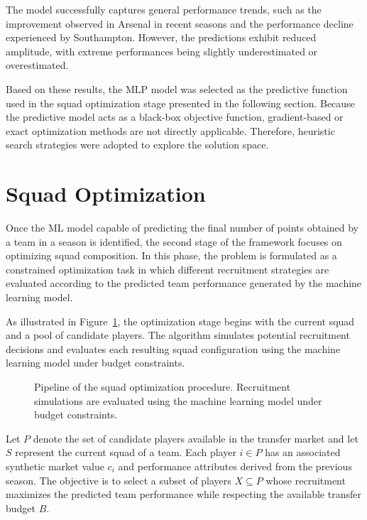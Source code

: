 \documentclass[a4paper,fleqn]{cas-sc}
\begin{document}
The model successfully captures general performance trends, such as the improvement observed in Arsenal in recent seasons and the performance decline
experienced by Southampton. However, the predictions exhibit reduced amplitude, with extreme performances being slightly underestimated or overestimated.

Based on these results, the MLP model was selected as the predictive function used in the squad optimization stage presented in the following section.
Because the predictive model acts as a black-box objective function, gradient-based or exact optimization methods are not directly applicable. 
Therefore, heuristic search strategies were adopted to explore the solution space.

\section{Squad Optimization}

Once the ML model capable of predicting the final number of points obtained by a team in a season is identified, the second stage of the framework
focuses on optimizing squad composition. In this phase, the problem is formulated as a constrained optimization task in which different recruitment strategies are
evaluated according to the predicted team performance generated by the machine learning model.

As illustrated in Figure~\ref{fig:optimization_pipeline}, the optimization stage begins with the current squad and a pool of candidate players. 
The algorithm simulates potential recruitment decisions and evaluates each resulting squad configuration using the machine learning model under 
budget constraints.

\begin{figure}[htbp]
\centering

\caption{Pipeline of the squad optimization procedure. Recruitment simulations are evaluated using the machine learning model under budget constraints.}
\label{fig:optimization_pipeline}
\end{figure}

Let $P$ denote the set of candidate players available in the transfer market and let $S$ represent the current squad of a team. 
Each player $i \in P$ has an associated synthetic market value $c_i$ and performance attributes derived from the previous season. 
The objective is to select a subset of players $X \subseteq P$ whose recruitment maximizes the predicted team performance while 
respecting the available transfer budget $B$.
\end{document}
